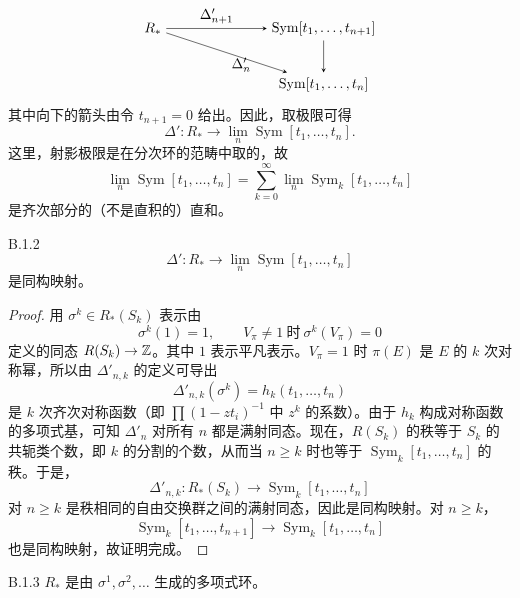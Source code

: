 \[
\begin{tikzpicture}[baseline=(current bounding box.center),>=stealth]
  \node (A) at (0,0) {$R_*$};
  \node (B) at (4.3,0) {$\operatorname{Sym}[t_1,\ldots,t_{n+1}]$};
  \node (C) at (4.3,-1.4) {$\operatorname{Sym}[t_1,\ldots,t_n]$};
  \draw[->] (A) -- node[above] {$\Delta'_{n+1}$} (B);
  \draw[->] (A) -- node[below right] {$\Delta'_n$} (C);
  \draw[->] (B) -- (C);
\end{tikzpicture}
\]
其中向下的箭头由令 $t_{n+1}=0$ 给出。因此，取极限可得
\[
  \Delta'\colon R_*\longrightarrow \lim_n \operatorname{Sym}[t_1,\ldots,t_n].
\]
这里，射影极限是在分次环的范畴中取的，故
\[
  \lim_n \operatorname{Sym}[t_1,\ldots,t_n]
  = \sum_{k=0}^\infty \lim_n \operatorname{Sym}_k[t_1,\ldots,t_n]
\]
是齐次部分的（不是直积的）直和。

\begin{proposition*}{B.1.2}
  \[
    \Delta'\colon R_*\longrightarrow \lim_n \operatorname{Sym}[t_1,\ldots,t_n]
  \]
  是同构映射。
\end{proposition*}

\begin{proof}
  用 $\sigma^k\in R_*(S_k)$ 表示由
  \[
    \sigma^k(1)=1,\qquad
    V_\pi\neq 1\ \text{时}\ \sigma^k(V_\pi)=0
  \]
  定义的同态 $R(S_k)\to\mathbb{Z}$。其中 $1$ 表示平凡表示。$V_\pi=1$ 时 $\pi(E)$ 是 $E$ 的 $k$ 次对称幂，所以由 $\Delta'_{n,k}$ 的定义可导出
  \[
    \Delta'_{n,k}(\sigma^k) = h_k(t_1,\ldots,t_n)
  \]
  是 $k$ 次齐次对称函数（即 $\prod(1-zt_i)^{-1}$ 中 $z^k$ 的系数）。由于 $h_k$ 构成对称函数的多项式基，可知 $\Delta'_n$ 对所有 $n$ 都是满射同态。现在，$R(S_k)$ 的秩等于 $S_k$ 的共轭类个数，即
  $k$ 的分割的个数，从而当 $n\ge k$ 时也等于 $\operatorname{Sym}_k[t_1,\ldots,t_n]$ 的秩。于是，
  \[
    \Delta'_{n,k}\colon R_*(S_k)\longrightarrow \operatorname{Sym}_k[t_1,\ldots,t_n]
  \]
  对 $n\ge k$ 是秩相同的自由交换群之间的满射同态，因此是同构映射。对 $n\ge k$，
  \[
    \operatorname{Sym}_k[t_1,\ldots,t_{n+1}]
    \longrightarrow \operatorname{Sym}_k[t_1,\ldots,t_n]
  \]
  也是同构映射，故证明完成。
\end{proof}


\begin{corollary*}{B.1.3}
  $R_*$ 是由 $\sigma^1,\sigma^2,\ldots$ 生成的多项式环。
\end{corollary*}

